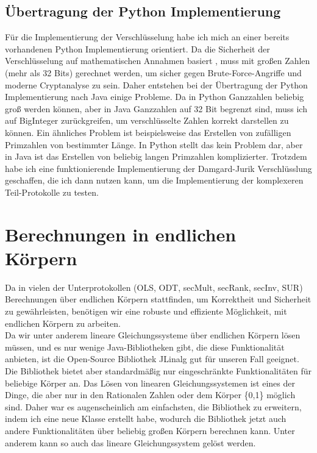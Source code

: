 \subsection{Übertragung der Python Implementierung}
Für die Implementierung der Verschlüsselung habe ich mich an einer bereits vorhandenen Python Implementierung \cite{swansonk14} orientiert. Da die Sicherheit der Verschlüsselung auf mathematischen Annahmen basiert  \cite{10.1007/3-540-48910-X_16}, muss mit großen Zahlen (mehr als 32 Bits) gerechnet werden, um sicher gegen Brute-Force-Angriffe und moderne Cryptanalyse zu sein. Daher entstehen bei der Übertragung der Python Implementierung nach Java einige Probleme. Da in Python Ganzzahlen beliebig groß werden können, aber in Java Ganzzahlen auf 32 Bit begrenzt sind, muss ich auf BigInteger zurückgreifen, um verschlüsselte Zahlen korrekt darstellen zu können.
Ein ähnliches Problem ist beispielsweise das Erstellen von zufälligen Primzahlen von bestimmter Länge. In Python stellt das kein Problem dar, aber in Java ist das Erstellen von beliebig langen Primzahlen komplizierter. Trotzdem habe ich eine funktionierende Implementierung der Damgard-Jurik Verschlüsslung geschaffen, die ich dann nutzen kann, um die Implementierung der komplexeren Teil-Protokolle zu testen.

\section{Berechnungen in endlichen Körpern}
Da in vielen der Unterprotokollen (OLS, ODT, secMult, secRank, secInv, SUR) Berechnungen über endlichen Körpern stattfinden, um Korrektheit und Sicherheit zu gewährleisten, benötigen wir eine robuste und effiziente Möglichkeit, mit endlichen Körpern zu arbeiten.\\
Da wir unter anderem lineare Gleichungssysteme über endlichen Körpern lösen müssen, und es nur wenige Java-Bibliotheken gibt, die diese Funktionalität anbieten, ist die Open-Source Bibliothek JLinalg \cite{JLinAlg} gut für unseren Fall geeignet. Die Bibliothek bietet aber standardmäßig nur eingeschränkte Funktionalitäten für beliebige Körper an. Das Lösen von linearen Gleichungssystemen ist eines der Dinge, die aber nur in den  Rationalen Zahlen oder dem Körper \{0,1\} möglich sind. Daher war es augenscheinlich am einfachsten, die Bibliothek zu erweitern, indem ich eine neue Klasse erstellt habe, wodurch die Bibliothek jetzt auch andere Funktionalitäten über beliebig großen Körpern berechnen kann. Unter anderem kann so auch das lineare Gleichungssystem gelöst werden.\\

